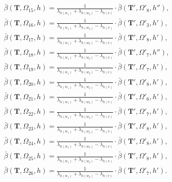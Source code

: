 \documentclass[superscriptaddress,onecolumn,nofootinbib,longbibliography,a4paper,accepted=2026-09-29]{quantumarticle}
\theoremstyle{plain}
\theoremstyle{definition}
\numberwithin{thm}{section}
\numberwithin{assumption}{section}
\numberwithin{lemma}{section}
\numberwithin{prop}{section}
\numberwithin{cor}{section}
\numberwithin{definition}{section}
\numberwithin{rmk}{section}
\numberwithin{equation}{section}
\newcommand{\mbf}{\mathbf{T}}
\begin{document}
\begin{itemize}
\begin{align}
\bar{\beta}(\mbf, \Omega_{15}, h)
=\frac{1}{\lambda_{h(w_1)}+\lambda_{h(w_2)}-\lambda_{h(v)}} \cdot
\bar{\beta}(\mbf', \Omega'_8, h''),\\
\bar{\beta}(\mbf, \Omega_{16}, h)
=\frac{1}{\lambda_{h(w_1)}+\lambda_{h(w_2)}-\lambda_{h(v)}} \cdot
\bar{\beta}(\mbf', \Omega'_3, h'),\\
\bar{\beta}(\mbf, \Omega_{17}, h)
=\frac{1}{\lambda_{h(w_1)}+\lambda_{h(w_2)}-\lambda_{h(v)}} \cdot
\bar{\beta}(\mbf', \Omega'_8, h'),\\
\bar{\beta}(\mbf, \Omega_{18}, h)
=\frac{1}{\lambda_{h(w_1)}+\lambda_{h(w_2)}-\lambda_{h(v)}} \cdot
\bar{\beta}(\mbf', \Omega'_7, h''),\\
\bar{\beta}(\mbf, \Omega_{19}, h)
=\frac{1}{\lambda_{h(w_1)}+\lambda_{h(w_2)}-\lambda_{h(v)}} \cdot
\bar{\beta}(\mbf', \Omega'_7, h'),\\
\bar{\beta}(\mbf, \Omega_{20}, h)
=\frac{1}{\lambda_{h(w_1)}+\lambda_{h(w_2)}-\lambda_{h(v)}} \cdot
\bar{\beta}(\mbf', \Omega'_8, h'),\\
\bar{\beta}(\mbf, \Omega_{21}, h)
=\frac{1}{\lambda_{h(w_1)}+\lambda_{h(w_2)}-\lambda_{h(v)}} \cdot
\bar{\beta}(\mbf', \Omega'_6, h'), \\
\bar{\beta}(\mbf, \Omega_{22}, h)
=\frac{1}{\lambda_{h(w_1)}+\lambda_{h(w_2)}-\lambda_{h(v)}} \cdot
\bar{\beta}(\mbf', \Omega'_7, h'), \\
\bar{\beta}(\mbf, \Omega_{23}, h)
=\frac{1}{\lambda_{h(w_1)}+\lambda_{h(w_2)}-\lambda_{h(v)}} \cdot
\bar{\beta}(\mbf', \Omega'_8, h'), \\
\bar{\beta}(\mbf, \Omega_{24}, h)
=\frac{1}{\lambda_{h(w_1)}+\lambda_{h(w_2)}-\lambda_{h(v)}} \cdot
\bar{\beta}(\mbf', \Omega'_8, h'), \\
\bar{\beta}(\mbf, \Omega_{25}, h)
=\frac{1}{\lambda_{h(w_1)}+\lambda_{h(w_2)}-\lambda_{h(v)}} \cdot
\bar{\beta}(\mbf', \Omega'_8, h'), \\
\bar{\beta}(\mbf, \Omega_{26}, h)
=\frac{1}{\lambda_{h(w_1)}+\lambda_{h(w_2)}-\lambda_{h(v)}} \cdot
\bar{\beta}(\mbf', \Omega'_7, h').
\end{align}


\end{itemize}
\end{document}
